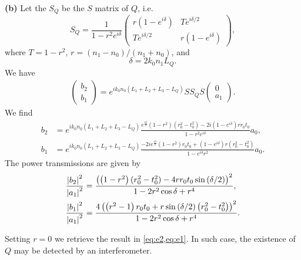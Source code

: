 \documentclass{article}
\makeatletter
\newcommand*{\shifttext}[1]{%
  \settowidth{\@tempdima}{#1}%
  \hspace{-\@tempdima}#1%
}
\newcommand{\plabel}[1]{%
\shifttext{\textbf{#1}\quad}%
}
\makeatother
\begin{document}
\plabel{(b)}%
Let the $S_Q$ be the $S$ matrix of $Q$, i.e.
\[ S_Q = \frac{1}{1- r^2 e^{i\delta}} \begin{pmatrix}
    r(1-e^{i\delta}) & T e^{i\delta/2} \\
    T e^{i\delta/2} & r(1-e^{i\delta})
\end{pmatrix}, \]
where $T = 1-r^2$, $r = (n_1 - n_0)/(n_1 + n_0)$, and
\[ \delta = 2 k_0 n_1 L_Q. \]
We have
\begin{align*}
    \begin{pmatrix}
        b_2 \\ b_1
    \end{pmatrix} = e^{ik_0n_0(L_1+L_2+L_3-L_Q)} S S_Q S \begin{pmatrix}
        0 \\ a_1
    \end{pmatrix}.
\end{align*}
We find
\begin{align*}
    b_2 &= e^{ik_0n_0(L_1+L_2+L_3-L_Q)}  \frac{ e^{\frac{i \delta }{2}} \left(1-r^2\right) (r_0^2-t_0^2)  - 2 i (1-e^{i\delta})r r_0 t_0 }{1- r^2 e^{i \delta }} a_0, \\
    b_1 &= e^{ik_0n_0(L_1+L_2+L_3-L_Q)}   \frac{-2 i e^{\frac{i \delta }{2}} \left(1-r^2\right) r_0 t_0 + (1 - e^{i \delta }) r (r_0^2-t_0^2)}{1-e^{i \delta } r^2} a_0.
\end{align*}
The power transmissions are given by
\begin{align*}
    \frac{\abs{b_2}^2}{\abs{a_1}^2} &= \frac{\left(\left(1-r^2\right) (r_0^2 - t_0^2) - 4 r r_0 t_0 \sin \left(\delta/2\right)\right)^2}{1 -2 r^2 \cos \delta +r^4}, \\
    \frac{\abs{b_1}^2}{\abs{a_1}^2} &= \frac{4 \left(\left(r^2-1\right) r_0 t_0 +r \sin \left(\delta/2\right) \left(r_0^2 - t_0^2\right)\right)^2}{1-2 r^2 \cos \delta +r^4}.
\end{align*}

Setting $r = 0$ we retrieve the result in \cref{eq:e2,eq:e1}.
In such case, the existence of $Q$ may be detected by an interferometer.
\end{document}

